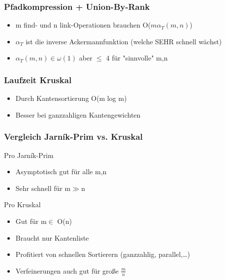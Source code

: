 \begin{frame}
\frametitle{Pfadkompression + Union-By-Rank}
\begin{itemize}
\item m find- und n link-Operationen brauchen O($m\alpha_T(m,n)$)
\item $\alpha_T$ ist die inverse Ackermannfunktion (welche SEHR schnell wächst)
\item $\alpha_T(m,n)\in\omega(1)$ aber $\leq$ 4 für "sinnvolle" m,n
\end{itemize}
\end{frame}

\begin{frame}
\frametitle{Laufzeit Kruskal}
\begin{itemize}
\item Durch Kantensortierung O(m log m)
\item Besser bei ganzzahligen Kantengewichten
\end{itemize}
\end{frame}

\begin{frame}
\frametitle{Vergleich Jarník-Prim vs. Kruskal}
Pro Jarník-Prim
\begin{itemize}
\item Asymptotisch gut für alle m,n
\item Sehr schnell für m$\gg$n
\end{itemize}
Pro Kruskal
\begin{itemize}
\item Gut für m$\in$ O(n)
\item Braucht nur Kantenliste
\item Profitiert von schnellen Sortierern (ganzzahlig, parallel,\ldots)
\item Verfeinerungen auch gut für große $\frac{m}{n}$
\end{itemize}
\end{frame}
